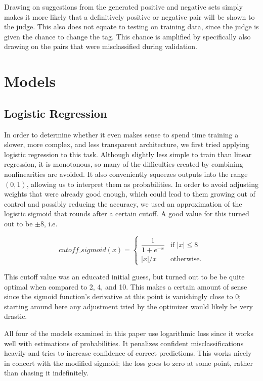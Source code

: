 \documentclass[a4paper, 12pt]{article}
\begin{document}
Drawing on suggestions from the generated positive and negative sets simply makes it more likely that a definitively positive or negative pair will be shown to the judge. This also does not equate to testing on training data, since the judge is given the chance to change the tag. This chance is amplified by specifically also drawing on the pairs that were misclassified during validation.


\section{Models}

\subsection{Logistic Regression}
In order to determine whether it even makes sense to spend time training a slower, more complex, and less transparent architecture, we first tried applying logistic regression to this task. Although slightly less simple to train than linear regression, it is monotonous, so many of the difficulties created by combining nonlinearities are avoided. It also conveniently squeezes outputs into the range $ (0, 1) $, allowing us to interpret them as probabilities. In order to avoid adjusting weights that were already good enough, which could lead to them growing out of control and possibly reducing the accuracy, we used an approximation of the logistic sigmoid that rounds after a certain cutoff. A good value for this turned out to be $ \pm 8 $, i.e.

\begin{equation} \label{eq:5}
	cutoff\_sigmoid(x) =
	\begin{cases}
		\dfrac{1}{1 + e^{-x}} & \text{if } |x| \leq 8 \\
		|x| / x               & \text{otherwise.}
	\end{cases}
\end{equation}

This cutoff value was an educated initial guess, but turned out to be be quite optimal when compared to 2, 4, and 10. This makes a certain amount of sense since the sigmoid function's derivative at this point is vanishingly close to 0; starting around here any adjustment tried by the optimizer would likely be very drastic.

All four of the models examined in this paper use logarithmic loss since it works well with estimations of probabilities. It penalizes confident misclassifications heavily and tries to increase confidence of correct predictions. This works nicely in concert with the modified sigmoid; the loss goes to zero at some point, rather than chasing it indefinitely.
\end{document}
